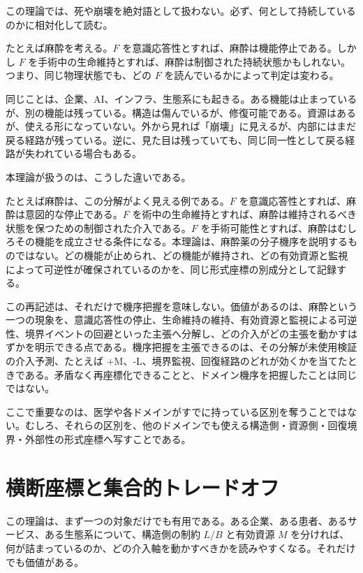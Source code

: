 \documentclass[12pt,a4paper]{article}
\begin{document}
この理論では、死や崩壊を絶対語として扱わない。必ず、何として持続しているのかに相対化して読む。

たとえば麻酔を考える。\(F\) を意識応答性とすれば、麻酔は機能停止である。しかし \(F\) を手術中の生命維持とすれば、麻酔は制御された持続状態かもしれない。つまり、同じ物理状態でも、どの \(F\) を読んでいるかによって判定は変わる。

同じことは、企業、AI、インフラ、生態系にも起きる。ある機能は止まっているが、別の機能は残っている。構造は傷んでいるが、修復可能である。資源はあるが、使える形になっていない。外から見れば「崩壊」に見えるが、内部にはまだ戻る経路が残っている。逆に、見た目は残っていても、同じ同一性として戻る経路が失われている場合もある。

本理論が扱うのは、こうした違いである。

たとえば麻酔は、この分解がよく見える例である。\(F\) を意識応答性とすれば、麻酔は意図的な停止である。\(F\) を術中の生命維持とすれば、麻酔は維持されるべき状態を保つための制御された介入である。\(F\) を手術可能性とすれば、麻酔はむしろその機能を成立させる条件になる。本理論は、麻酔薬の分子機序を説明するものではない。どの機能が止められ、どの機能が維持され、どの有効資源と監視によって可逆性が確保されているのかを、同じ形式座標の別成分として記録する。

この再記述は、それだけで機序把握を意味しない。価値があるのは、麻酔という一つの現象を、意識応答性の停止、生命維持の維持、有効資源と監視による可逆性、境界イベントの回避といった主張へ分解し、どの介入がどの主張を動かすはずかを明示できる点である。機序把握を主張できるのは、その分解が未使用検証の介入予測、たとえば +M、-L、境界監視、回復経路のどれが効くかを当てたときである。矛盾なく再座標化できることと、ドメイン機序を把握したことは同じではない。

ここで重要なのは、医学や各ドメインがすでに持っている区別を奪うことではない。むしろ、それらの区別を、他のドメインでも使える構造側・資源側・回復境界・外部性の形式座標へ写すことである。

\section{横断座標と集合的トレードオフ}\label{ux6a2aux65adux5ea7ux6a19ux3068ux96c6ux5408ux7684ux30c8ux30ecux30fcux30c9ux30aaux30d5}

この理論は、まず一つの対象だけでも有用である。ある企業、ある患者、あるサービス、ある生態系について、構造側の制約 \(L/B\) と有効資源 \(M\) を分ければ、何が詰まっているのか、どの介入軸を動かすべきかを読みやすくなる。それだけでも価値がある。
\end{document}
